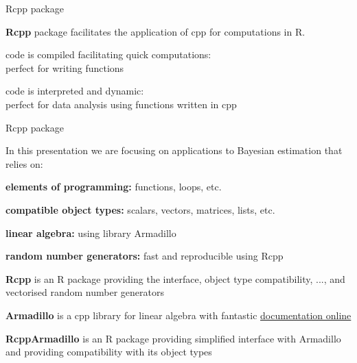 \documentclass[notes,blackandwhite,mathsans]{beamer}
\begin{document}
{
\begin{frame}{Rcpp package}

\bigskip \textbf{Rcpp} package facilitates the application of cpp for computations in R.


\begin{description}
\smallskip\item[cpp] {\color{darkgray}code is compiled facilitating quick computations:}\\ {\color{purple}perfect for writing functions}

\smallskip\item[R] {\color{darkgray}code is interpreted and dynamic:}\\ {\color{purple}perfect for data analysis using functions written in cpp}
\end{description}

\end{frame}




\begin{frame}{Rcpp package}

In this presentation we are focusing on applications to Bayesian estimation that relies on:\small

\bigskip\textbf{elements of programming:} {\color{darkgray}functions, loops, etc.}

\smallskip\textbf{compatible object types:} {\color{darkgray}scalars, vectors, matrices, lists, etc.}

\smallskip\textbf{linear algebra:} {\color{darkgray}using library} Armadillo

\smallskip\textbf{random number generators:} {\color{darkgray}fast and reproducible using} Rcpp

\vspace{1cm}
\textbf{Rcpp} {\color{darkgray}is an R package providing the interface, object type compatibility, ..., and} {\color{purple}vectorised random number generators }

\smallskip\textbf{Armadillo} {\color{darkgray}is a cpp library for linear algebra with fantastic \href{http://arma.sourceforge.net/docs.html}{documentation online}} {\color{purple}}

\smallskip\textbf{RcppArmadillo} {\color{darkgray}is an R package providing simplified interface with} Armadillo {\color{darkgray}and providing compatibility with its object types}


\end{frame}}
\end{document}
